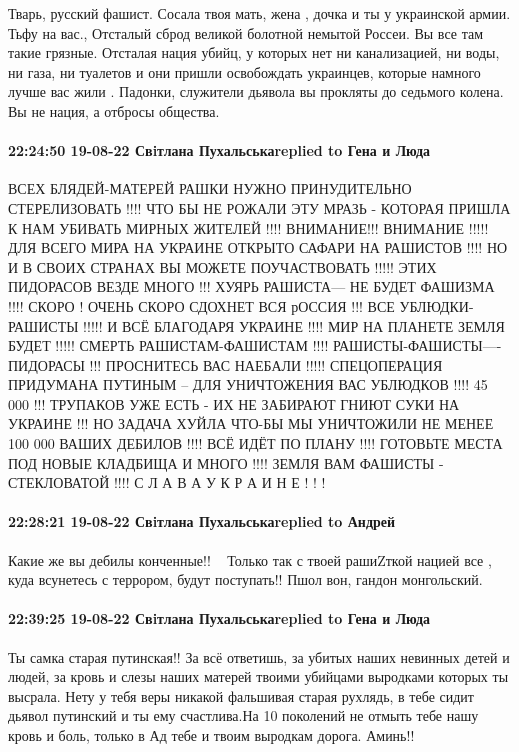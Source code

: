 Тварь, русский фашист. Сосала твоя мать, жена , дочка и ты у украинской армии.
Тьфу на вас., Отсталый сброд великой болотной немытой Россеи. Вы все там такие
грязные. Отсталая нация убийц, у которых нет ни канализацией, ни воды, ни газа,
ни туалетов и они пришли освобождать украинцев, которые намного лучше вас жили
. Падонки, служители дьявола вы прокляты до седьмого колена. Вы не нация, а
отбросы общества.

\paragraph{22:24:50 19-08-22 Свiтлана Пухальськаreplied to Гена и Люда}

ВСЕХ БЛЯДЕЙ-МАТЕРЕЙ РАШКИ НУЖНО ПРИНУДИТЕЛЬНО СТЕРЕЛИЗОВАТЬ !!!! ЧТО БЫ НЕ
РОЖАЛИ ЭТУ МРАЗЬ - КОТОРАЯ ПРИШЛА К НАМ УБИВАТЬ МИРНЫХ ЖИТЕЛЕЙ !!!! ВНИМАНИЕ!!!
ВНИМАНИЕ !!!!! ДЛЯ ВСЕГО МИРА НА УКРАИНЕ ОТКРЫТО САФАРИ НА РАШИСТОВ !!!! НО И В
СВОИХ СТРАНАХ ВЫ МОЖЕТЕ ПОУЧАСТВОВАТЬ !!!!! ЭТИХ ПИДОРАСОВ ВЕЗДЕ МНОГО !!!
ХУЯРЬ РАШИСТА--- НЕ БУДЕТ ФАШИЗМА !!!! СКОРО ! ОЧЕНЬ СКОРО СДОХНЕТ ВСЯ рОССИЯ
!!! ВСЕ УБЛЮДКИ-РАШИСТЫ !!!!! И ВСЁ БЛАГОДАРЯ УКРАИНЕ !!!! МИР НА ПЛАНЕТЕ ЗЕМЛЯ
БУДЕТ !!!!! СМЕРТЬ РАШИСТАМ-ФАШИСТАМ !!!! РАШИСТЫ-ФАШИСТЫ----ПИДОРАСЫ !!!
ПРОСНИТЕСЬ ВАС НАЕБАЛИ !!!!! СПЕЦОПЕРАЦИЯ ПРИДУМАНА ПУТИНЫМ -- ДЛЯ УНИЧТОЖЕНИЯ
ВАС УБЛЮДКОВ !!!! 45 000 !!! ТРУПАКОВ УЖЕ ЕСТЬ - ИХ НЕ ЗАБИРАЮТ ГНИЮТ СУКИ НА
УКРАИНЕ !!! НО ЗАДАЧА ХУЙЛА ЧТО-БЫ МЫ УНИЧТОЖИЛИ НЕ МЕНЕЕ 100 000 ВАШИХ ДЕБИЛОВ
!!!! ВСЁ ИДЁТ ПО ПЛАНУ !!!! ГОТОВЬТЕ МЕСТА ПОД НОВЫЕ КЛАДБИЩА И МНОГО !!!!
ЗЕМЛЯ ВАМ ФАШИСТЫ - СТЕКЛОВАТОЙ !!!! С Л А В А У К Р А И Н Е ! ! !

\paragraph{22:28:21 19-08-22 Свiтлана Пухальськаreplied to Андрей}

Какие же вы дебилы конченные!!🤣🤣🤣 Только так с твоей рашиZткой нацией все ,
куда всунетесь с террором, будут поступать!! Пшол вон, гандон монгольский.

\paragraph{22:39:25 19-08-22 Свiтлана Пухальськаreplied to Гена и Люда}

Ты самка старая путинская!! За всё ответишь, за убитых наших невинных детей и
людей, за кровь и слезы наших матерей твоими убийцами выродками которых ты
высрала. Нету у тебя веры никакой фальшивая старая рухлядь, в тебе сидит дьявол
путинский и ты ему счастлива.На 10 поколений не отмыть тебе нашу кровь и боль,
только в Ад тебе и твоим выродкам дорога. Аминь!!

